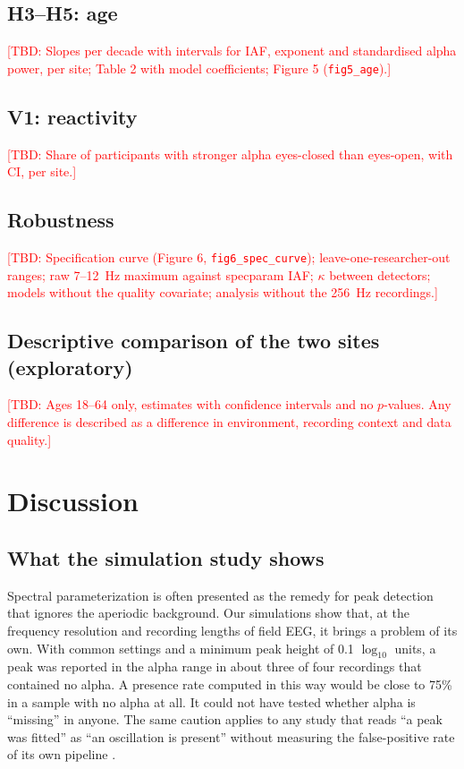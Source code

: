 \documentclass[11pt,a4paper]{article}
\newcommand{\TBD}[1]{\textcolor{red}{[TBD: #1]}}
\begin{document}
\subsection{H3--H5: age}
\TBD{Slopes per decade with intervals for IAF, exponent and standardised alpha power, per
site; Table 2 with model coefficients; Figure 5 (\texttt{fig5\_age}).}

\subsection{V1: reactivity}
\TBD{Share of participants with stronger alpha eyes-closed than eyes-open, with CI, per
site.}

\subsection{Robustness}
\TBD{Specification curve (Figure 6, \texttt{fig6\_spec\_curve}); leave-one-researcher-out
ranges; raw 7--12~Hz maximum against specparam IAF; $\kappa$ between detectors; models
without the quality covariate; analysis without the 256~Hz recordings.}

\subsection{Descriptive comparison of the two sites (exploratory)}
\TBD{Ages 18--64 only, estimates with confidence intervals and no $p$-values. Any
difference is described as a difference in environment, recording context and data
quality.}


\section{Discussion}

\subsection{What the simulation study shows}

Spectral parameterization is often presented as the remedy for peak detection that
ignores the aperiodic background. Our simulations show that, at the frequency resolution
and recording lengths of field EEG, it brings a problem of its own. With common settings
and a minimum peak height of 0.1 $\log_{10}$ units, a peak was reported in the alpha range
in about three of four recordings that contained no alpha. A presence rate computed in
this way would be close to 75\% in a sample with no alpha at all. It could not have tested
whether alpha is ``missing'' in anyone. The same caution applies to any study that reads
``a peak was fitted'' as ``an oscillation is present'' without measuring the false-positive
rate of its own pipeline \citep[see also][]{gerster2022,donoghue2022,ostlund2022}.
\end{document}
